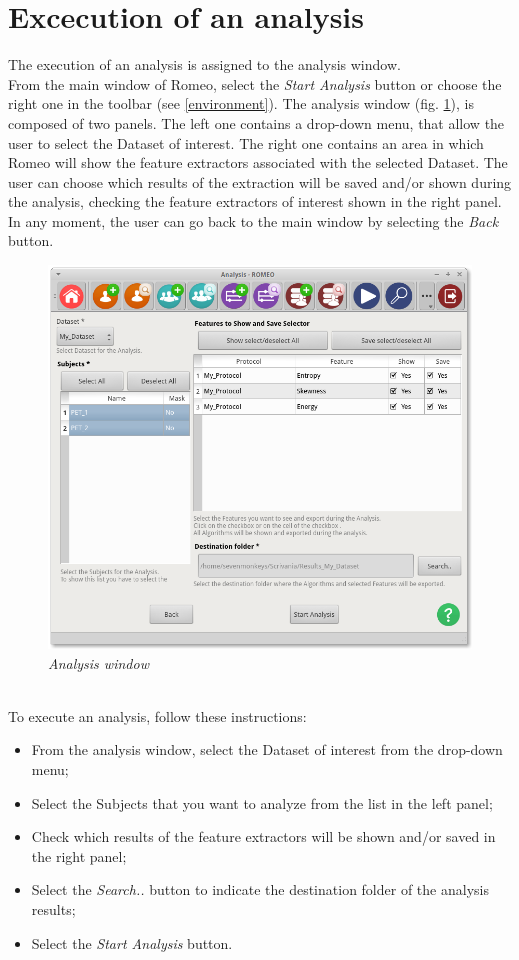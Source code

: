 \section{Excecution of an analysis}
\label{analysisexcecution}
The execution of an analysis is assigned to the analysis window.\\
From the main window of Romeo, select the \textit{Start Analysis} button or choose the right one in the toolbar (see \ref{environment}). The analysis window (fig. \ref{analysisimg}), is composed of two panels. The left one contains a drop-down menu, that allow the user to select the Dataset\g{} of interest. The right one contains an area in which Romeo will show the feature extractors\g{} associated with the selected Dataset\g{}. The user can choose which results of the extraction will be saved and/or shown during the analysis, checking the feature extractors\g{} of interest shown in the right panel. In any moment, the user can go back to the main window by selecting the \textit{Back} button.
\begin{figure}[!h]
\begin{center}
\includegraphics[scale=0.4]{./Images/StartAnalysis}
\caption{\textit{Analysis window}}
\label{analysisimg}
\end{center}
\end{figure}
\\To execute an analysis, follow these instructions:
\begin{itemize}
\item From the analysis window, select the Dataset\g{} of interest from the drop-down menu;
\item Select the Subjects\g{} that you want to analyze from the list in the left panel;
\item Check which results of the feature extractors\g{} will be shown and/or saved in the right panel;
\item Select the \textit{Search..} button to indicate the destination folder of the analysis results;
\item Select the \textit{Start Analysis} button.
\end{itemize}
